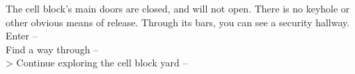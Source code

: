 The cell block’s main doors are closed, and will not open. There is no keyhole or other obvious means of release. Through its bars, you can see a security hallway.\\

 Enter -- \\
 Find a way through -- \\
> Continue exploring the cell block yard -- 